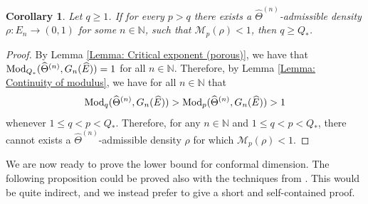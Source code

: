 \documentclass{amsart}
\newcommand{\Mod}{{\rm Mod}}
\newtheorem{corollary}[equation]{Corollary}
\numberwithin{equation}{section}
\theoremstyle{definition}
\theoremstyle{remark}
\newcommand{\N}{\mathbb{N}}
\newcommand{\cM}{\mathcal{M}}
\begin{document}
\begin{corollary}\label{Corollary: Density to exponent}
    Let \(q\geq 1\). If for every \(p>q\) there exists a \(\widehat{\Theta}^{(n)}\)-admissible density \(\rho:E_n\to(0,1)\) for some \(n\in\N\), such that \(\cM_p(\rho)<1\), then \(q\geq Q_*\).
\end{corollary}
\begin{proof}
    By Lemma \ref{Lemma: Critical exponent (porous)}, we have that  \(\Mod_{Q_*}(\widehat{\Theta}^{(n)},G_n(\widehat{E}))=1\) for all \(n\in\N\). Therefore, by Lemma \ref{Lemma: Continuity of modulus}, we have for all \(n\in\N\) that 
        \[
            \Mod_q(\widehat{\Theta}^{(n)},G_n(\widehat{E}))>\Mod_p(\widehat{\Theta}^{(n)},G_n(\widehat{E}))>1
        \]
    whenever \(1\leq q<p<Q_*\). Therefore, for any \(n\in\N\) and \(1\leq q<p<Q_*\), there cannot exists a \(\widehat{\Theta}^{(n)}\)-admissible density \(\rho\) for which \(\cM_p(\rho)<1\).
\end{proof}



We are now ready to prove the lower bound for conformal dimension. The following proposition could be proved also with the techniques from \cite{Carrasco}. This would be quite indirect, and we instead prefer to give a short and self-contained proof. 
\end{document}
